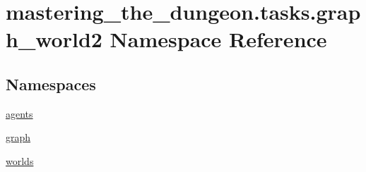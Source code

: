 \hypertarget{namespacemastering__the__dungeon_1_1tasks_1_1graph__world2}{}\section{mastering\+\_\+the\+\_\+dungeon.\+tasks.\+graph\+\_\+world2 Namespace Reference}
\label{namespacemastering__the__dungeon_1_1tasks_1_1graph__world2}
\subsection*{Namespaces}
\begin{DoxyCompactItemize}
\item 
 \hyperlink{namespacemastering__the__dungeon_1_1tasks_1_1graph__world2_1_1agents}{agents}
\item 
 \hyperlink{namespacemastering__the__dungeon_1_1tasks_1_1graph__world2_1_1graph}{graph}
\item 
 \hyperlink{namespacemastering__the__dungeon_1_1tasks_1_1graph__world2_1_1worlds}{worlds}
\end{DoxyCompactItemize}
